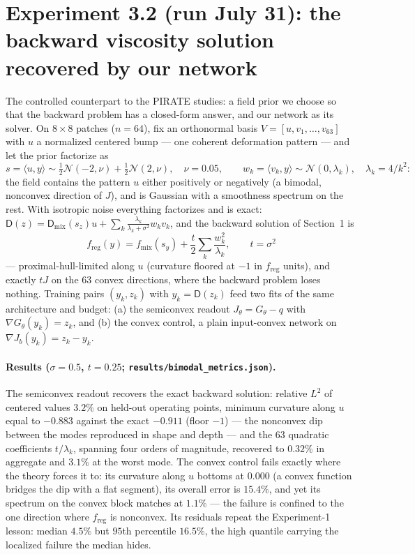 \documentclass[11pt]{article}
\newcommand{\D}{\mathsf{D}}
\newcommand{\freg}{f_{\mathrm{reg}}}
\begin{document}
\section{Experiment 3.2 (run July 31): the backward viscosity solution recovered by our network}
\label{sec:expbimodal}

The controlled counterpart to the PIRATE studies: a field prior we choose so that the backward problem has a closed-form answer, and our network as its solver. On $8\times8$ patches ($n = 64$), fix an orthonormal basis $V = [u, v_1, \dots, v_{63}]$ with $u$ a normalized centered bump --- one coherent deformation pattern --- and let the prior factorize as
\[
s = \langle u, y\rangle \sim \tfrac12\mathcal N(-2, \nu) + \tfrac12\mathcal N(2, \nu), \quad \nu = 0.05, \qquad w_k = \langle v_k, y \rangle \sim \mathcal N(0, \lambda_k), \quad \lambda_k = 4/k^2:
\]
the field contains the pattern $u$ either positively or negatively (a bimodal, nonconvex direction of $J$), and is Gaussian with a smoothness spectrum on the rest. With isotropic noise everything factorizes and is exact: $\D(z) = \D_{\mathrm{mix}}(s_z)u + \sum_k \frac{\lambda_k}{\lambda_k + \sigma^2} w_k v_k$, and the backward solution of Section~1 is
\[
\freg(y) = f_{\mathrm{mix}}(s_y) + \frac{t}{2}\sum_{k} \frac{w_k^2}{\lambda_k}, \qquad t = \sigma^2
\]
--- proximal-hull-limited along $u$ (curvature floored at $-1$ in $\freg$ units), and exactly $t J$ on the 63 convex directions, where the backward problem loses nothing. Training pairs $(y_k, z_k)$ with $y_k = \D(z_k)$ feed two fits of the same architecture and budget: (a) the semiconvex readout $J_\theta = G_\theta - q$ with $\nabla G_\theta(y_k) = z_k$, and (b) the convex control, a plain input-convex network on $\nabla J_b(y_k) = z_k - y_k$.

\paragraph{Results ($\sigma = 0.5$, $t = 0.25$; \texttt{results/bimodal\_metrics.json}).} The semiconvex readout recovers the exact backward solution: relative $L^2$ of centered values $3.2\%$ on held-out operating points, minimum curvature along $u$ equal to $-0.883$ against the exact $-0.911$ (floor $-1$) --- the nonconvex dip between the modes reproduced in shape and depth --- and the $63$ quadratic coefficients $t/\lambda_k$, spanning four orders of magnitude, recovered to $0.32\%$ in aggregate and $3.1\%$ at the worst mode. The convex control fails exactly where the theory forces it to: its curvature along $u$ bottoms at $0.000$ (a convex function bridges the dip with a flat segment), its overall error is $15.4\%$, and yet its spectrum on the convex block matches at $1.1\%$ --- the failure is confined to the one direction where $\freg$ is nonconvex. Its residuals repeat the Experiment-1 lesson: median $4.5\%$ but $95$th percentile $16.5\%$, the high quantile carrying the localized failure the median hides.
\end{document}

